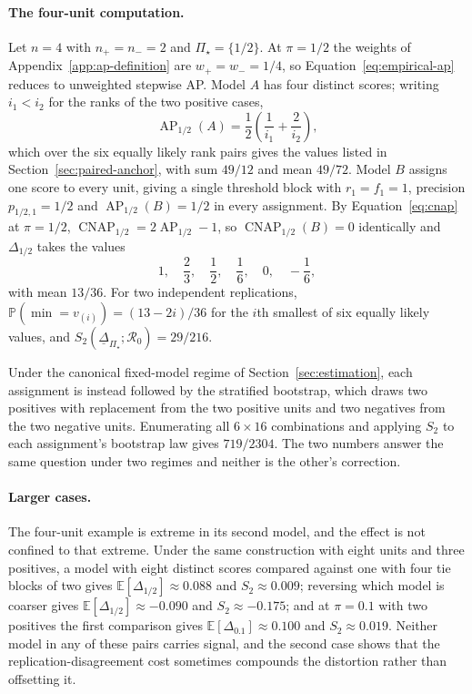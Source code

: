 \documentclass[11pt]{article}
\newcommand{\AP}{\operatorname{AP}}
\newcommand{\CNAP}{\operatorname{CNAP}}
\newcommand{\Regime}{\mathcal{R}}
\newcommand{\PSet}{\Pi_\star}
\newcommand{\E}{\mathbb{E}}
\newcommand{\Prb}{\mathbb{P}}
\newcommand{\RobDelta}{\underline{\Delta}_{\PSet}}
\theoremstyle{remark}
\begin{document}
\paragraph{The four-unit computation.}
Let $n=4$ with $n_+=n_-=2$ and $\PSet=\{1/2\}$. At $\pi=1/2$ the weights of Appendix~\ref{app:ap-definition} are $w_+=w_-=1/4$, so Equation~\eqref{eq:empirical-ap} reduces to unweighted stepwise AP. Model $A$ has four distinct scores; writing $i_1<i_2$ for the ranks of the two positive cases,
\[
\AP_{1/2}(A)
=
\frac12
\left(
\frac{1}{i_1}+\frac{2}{i_2}
\right),
\]
which over the six equally likely rank pairs gives the values listed in Section~\ref{sec:paired-anchor}, with sum $49/12$ and mean $49/72$. Model $B$ assigns one score to every unit, giving a single threshold block with $r_1=f_1=1$, precision $p_{1/2,1}=1/2$ and $\AP_{1/2}(B)=1/2$ in every assignment. By Equation~\eqref{eq:cnap} at $\pi=1/2$, $\CNAP_{1/2}=2\AP_{1/2}-1$, so $\CNAP_{1/2}(B)=0$ identically and $\Delta_{1/2}$ takes the values
\[
1,\quad
\frac23,\quad
\frac12,\quad
\frac16,\quad
0,\quad
-\frac16 ,
\]
with mean $13/36$. For two independent replications, $\Prb(\min=v_{(i)})=(13-2i)/36$ for the $i$th smallest of six equally likely values, and $S_2(\RobDelta;\Regime_0)=29/216$.

Under the canonical fixed-model regime of Section~\ref{sec:estimation}, each assignment is instead followed by the stratified bootstrap, which draws two positives with replacement from the two positive units and two negatives from the two negative units. Enumerating all $6\times16$ combinations and applying $S_2$ to each assignment's bootstrap law gives $719/2304$. The two numbers answer the same question under two regimes and neither is the other's correction.

\paragraph{Larger cases.}
The four-unit example is extreme in its second model, and the effect is not confined to that extreme. Under the same construction with eight units and three positives, a model with eight distinct scores compared against one with four tie blocks of two gives $\E[\Delta_{1/2}]\approx0.088$ and $S_2\approx0.009$; reversing which model is coarser gives $\E[\Delta_{1/2}]\approx-0.090$ and $S_2\approx-0.175$; and at $\pi=0.1$ with two positives the first comparison gives $\E[\Delta_{0.1}]\approx0.100$ and $S_2\approx0.019$. Neither model in any of these pairs carries signal, and the second case shows that the replication-disagreement cost sometimes compounds the distortion rather than offsetting it.
\end{document}
